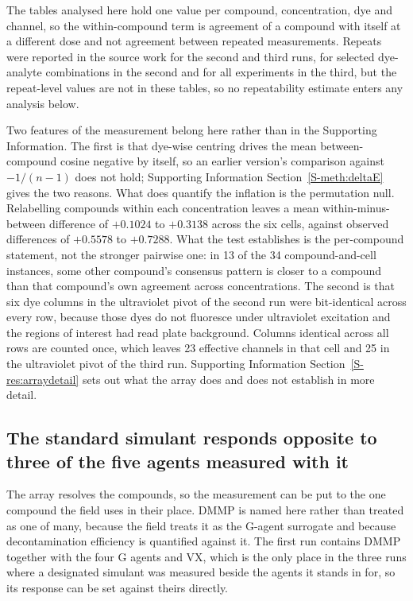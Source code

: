 \documentclass[journal=jacsat,manuscript=article,margin=1in]{achemso}
\begin{document}
The tables analysed here hold one value per compound, concentration, dye
and channel, so the within-compound term is agreement of a compound with
itself at a different dose and not agreement between repeated
measurements. Repeats were reported in the source work for the second and
third runs, for selected dye-analyte combinations in the
second\cite{multiplexref} and for all experiments in the
third\cite{group3ref}, but the repeat-level values are not in these
tables, so no repeatability estimate enters any analysis below.

Two features of the measurement belong here rather than in the Supporting
Information. The first is that dye-wise centring drives the mean
between-compound cosine negative by itself, so an earlier version's
comparison against $-1/(n-1)$ does not hold; Supporting Information
Section~\ref{S-meth:deltaE} gives the two reasons. What does quantify the
inflation is the permutation null. Relabelling compounds within each
concentration leaves a mean within-minus-between difference of $+0.1024$ to
$+0.3138$ across the six cells, against observed differences of $+0.5578$ to
$+0.7288$. What the test establishes is the per-compound statement, not the
stronger pairwise one: in 13 of the 34 compound-and-cell instances, some
other compound's consensus pattern is closer to a compound than that
compound's own agreement across concentrations. The second is that six dye
columns in the ultraviolet pivot of the second run were bit-identical across
every row, because those dyes do not fluoresce under ultraviolet excitation
and the regions of interest had read plate background. Columns identical
across all rows are counted once, which leaves 23 effective channels in that
cell and 25 in the ultraviolet pivot of the third run. Supporting Information
Section~\ref{S-res:arraydetail} sets out what the array does and does not
establish in more detail.

\subsection{The standard simulant responds opposite to three of the five
agents measured with it}
\label{res:dmmp}

The array resolves the compounds, so the measurement can be put to the one
compound the field uses in their place. DMMP is named here rather than
treated as one of many, because the field treats it as the G-agent surrogate
and because decontamination efficiency is quantified against it. The first
run contains DMMP together with the four G agents and VX, which is the only
place in the three runs where a designated simulant was measured beside the
agents it stands in for, so its response can be set against theirs
directly.
\end{document}
